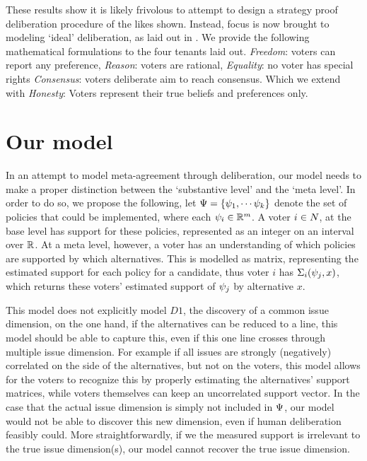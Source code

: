 These results show it is likely frivolous to attempt to design a strategy proof deliberation procedure of the likes shown. Instead, focus is now brought to modeling `ideal' deliberation, as laid out in . We provide the following mathematical formulations to the four tenants laid out. \emph{Freedom}: voters can report any preference, \emph{Reason}: voters are rational, \emph{Equality}: no voter has special rights \emph{Consensus}:  voters deliberate aim to reach consensus. Which we extend with \emph{Honesty}: Voters represent their true beliefs and preferences only.


\section{Our model}
\label{sec: main model}

In an attempt to model meta-agreement through deliberation, our model needs to make a proper distinction between the `substantive level' and the `meta level'. In order to do so, we propose the following, let \(\Psi = \{\psi_{1}, \cdots \psi_{k}\}\) denote the set of policies that could be implemented, where each $\psi_i \in \mathbb{R}^{m}$. A voter $i \in N$, at the base level has support for these policies, represented as an integer on an interval over $\mathbb{R}$. At a meta level, however, a voter has an understanding of which policies are supported by which alternatives. This is modelled as matrix, representing the estimated support for each policy for a candidate, thus voter $i$ has $\Sigma_i(\psi_j, x)$, which returns these voters' estimated support of $\psi_j$ by alternative $x$.

This model does not explicitly model $D1$, the discovery of a common issue dimension, on the one hand, if the alternatives can be reduced to a line, this model should be able to capture this, even if this one line crosses through multiple issue dimension. For example if all issues are strongly (negatively) correlated on the side of the alternatives, but not on the voters, this model allows for the voters to recognize this by properly estimating the alternatives' support matrices, while voters themselves can keep an uncorrelated support vector. In the case that the actual issue dimension is simply not included in $\Psi$, our model would not be able to discover this new dimension, even if human deliberation feasibly could. More straightforwardly, if we the measured support is irrelevant to the true issue dimension(s), our model cannot recover the true issue dimension.

